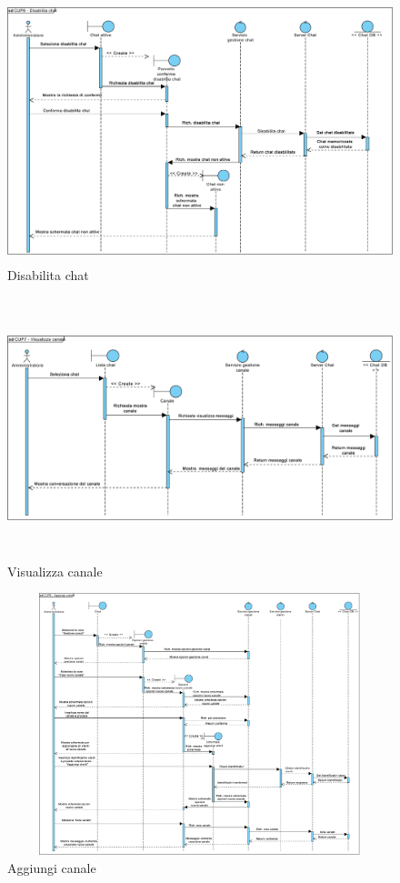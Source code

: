\begin{figure}
	\centering
	\includegraphics[height=3in,width=5in]{imgs/gruppo6/sequence/CUP6_disabilita_chat.pdf}
	\caption{Disabilita chat}
	\label{fig:prova}
\end{figure}

\begin{figure}
	\centering
	\includegraphics[height=3in,width=5in]{imgs/gruppo6/sequence/CUP7_visualizza_canale.pdf}
	\caption{Visualizza canale}
	\label{fig:prova}
\end{figure}

\begin{figure}
	\centering
	\includegraphics[height=3in,width=5in]{imgs/gruppo6/sequence/CUP8_aggiungi_canale.pdf}
	\caption{Aggiungi canale}
	\label{fig:prova}
\end{figure}

